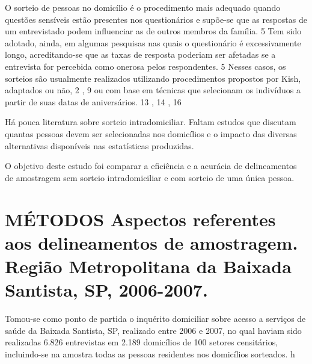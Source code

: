 \documentclass{article}
\begin{document}
O sorteio de pessoas no domicílio é o procedimento mais adequado quando questões sensíveis estão presentes nos questionários e supõe-se que as respostas de um entrevistado podem influenciar as de outros membros da família.%
5%
 Tem sido adotado, ainda, em algumas pesquisas nas quais o questionário é excessivamente longo, acreditando-se que as taxas de resposta poderiam ser afetadas se a entrevista for percebida como onerosa pelos respondentes.%
5%
 Nesses casos, os sorteios são usualmente realizados utilizando procedimentos propostos por Kish, adaptados ou não,%
2%
,%
9%
 ou com base em técnicas que selecionam os indivíduos a partir de suas datas de aniversários.%
13%
,%
14%
,%
16%


Há pouca literatura sobre sorteio intradomiciliar. Faltam estudos que discutam quantas pessoas devem ser selecionadas nos domicílios e o impacto das diversas alternativas disponíveis nas estatísticas produzidas.

O objetivo deste estudo foi comparar a eficiência e a acurácia de delineamentos de amostragem sem sorteio intradomiciliar e com sorteio de uma única pessoa.


\section{%
MÉTODOS%
Aspectos referentes aos delineamentos de amostragem. Região Metropolitana da Baixada Santista, SP, 2006-2007.}

Tomou-se como ponto de partida o inquérito domiciliar sobre acesso a serviços de saúde da Baixada Santista, SP, realizado entre 2006 e 2007, no qual haviam sido realizadas 6.826 entrevistas em 2.189 domicílios de 100 setores censitários, incluindo-se na amostra todas as pessoas residentes nos domicílios sorteados.%
h%
\end{document}
